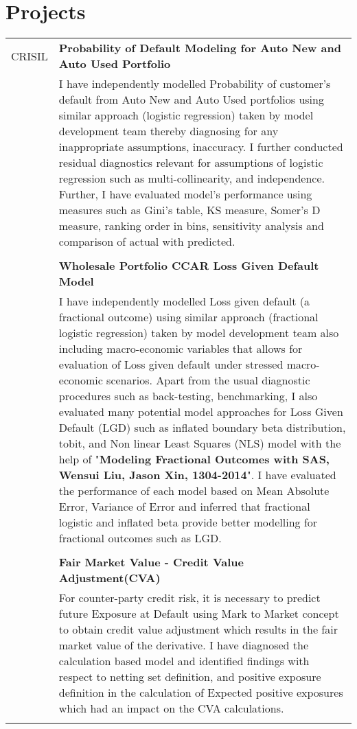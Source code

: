 \documentclass[a4paper,10pt]{article}
\begin{document}
\section{Projects}
\begin{tabular}{r|p{11cm}}
 \Large{CRISIL} 
  & \textbf{Probability of Default Modeling for Auto New and Auto Used Portfolio} \\ &\footnotesize{I have independently modelled Probability of customer's default from Auto New and Auto Used portfolios using similar approach (logistic regression) taken by model development team thereby diagnosing for any inappropriate assumptions, inaccuracy. I further conducted residual diagnostics relevant for assumptions of logistic regression such as multi-collinearity, and independence. Further, I have evaluated model's performance using measures such as Gini's table, KS measure, Somer's D measure, ranking order in bins, sensitivity analysis and comparison of actual with predicted. }\\\multicolumn{2}{c}{} \\
 
& \textbf{Wholesale Portfolio CCAR Loss Given Default Model} \\ &\footnotesize{I have independently modelled Loss given default (a fractional outcome) using similar approach (fractional logistic regression) taken by model development team also including macro-economic variables that allows for evaluation of Loss given default under stressed macro-economic scenarios. Apart from the usual diagnostic procedures such as back-testing, benchmarking, I also evaluated many potential model approaches for Loss Given Default (LGD) such as inflated boundary beta distribution, tobit, and Non linear Least Squares (NLS) model with the help of "\textbf{Modeling Fractional Outcomes with SAS, Wensui Liu, Jason Xin, 1304-2014}". I have evaluated the performance of each model based on Mean Absolute Error, Variance of Error and inferred that fractional logistic and inflated beta provide better modelling for fractional outcomes such as LGD. }\\\multicolumn{2}{c}{} \\

& \textbf{Fair Market Value - Credit Value Adjustment(CVA)} \\ &\footnotesize{For counter-party credit risk, it is necessary to predict future Exposure at Default using Mark to Market concept to obtain credit value adjustment which results in the fair market value of the derivative. I have diagnosed the calculation based model and identified findings with respect to netting set definition, and positive exposure definition in the calculation of Expected positive exposures which had an impact on the CVA calculations.  }\\\multicolumn{2}{c}{} \\


\end{tabular}
\end{document}
